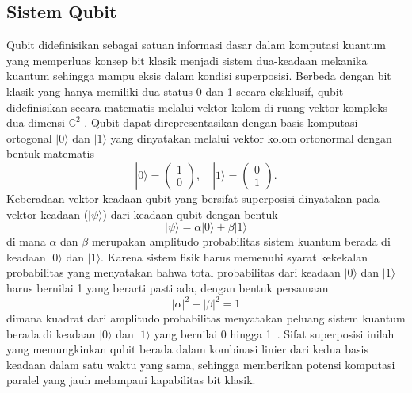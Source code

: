 \subsection{Sistem Qubit}
Qubit didefinisikan sebagai satuan informasi dasar dalam komputasi kuantum yang memperluas konsep bit klasik menjadi sistem dua-keadaan mekanika kuantum sehingga mampu eksis dalam kondisi superposisi. Berbeda dengan bit klasik yang hanya memiliki dua status 0 dan 1 secara eksklusif, qubit didefinisikan secara matematis melalui vektor kolom di ruang vektor kompleks dua-dimensi $\mathbb{C}^2$ \cite{nielsen_quantum_2010}. Qubit dapat direpresentasikan dengan basis komputasi ortogonal $|0\rangle$ dan $|1\rangle$ yang dinyatakan melalui vektor kolom ortonormal dengan bentuk matematis
\begin{equation}
\label{eq:basis_keadaan}
|0\rangle = \begin{pmatrix} 1 \\ 0 \end{pmatrix}, \quad |1\rangle = \begin{pmatrix} 0 \\ 1 \end{pmatrix}.
\end{equation}
Keberadaan vektor keadaan qubit yang bersifat superposisi dinyatakan pada vektor keadaan ($|\psi\rangle$) dari keadaan qubit dengan bentuk 
\begin{equation}
    |\psi\rangle = \alpha |0\rangle + \beta |1\rangle
\end{equation}
di mana $\alpha$ dan $\beta$ merupakan amplitudo probabilitas sistem kuantum berada di keadaan $|0\rangle$ dan $|1\rangle$. Karena sistem fisik harus memenuhi syarat kekekalan probabilitas yang menyatakan bahwa total probabilitas dari keadaan $|0\rangle$ dan $|1\rangle$ harus bernilai 1 yang berarti pasti ada, dengan bentuk persamaan 
\begin{equation}
    |\alpha|^2 + |\beta|^2 = 1
\end{equation}
dimana kuadrat dari amplitudo probabilitas menyatakan peluang sistem kuantum berada di keadaan $|0\rangle$ dan $|1\rangle$ yang bernilai 0 hingga 1~\cite{purwanto_fisika_2016}. Sifat superposisi inilah yang memungkinkan qubit berada dalam kombinasi linier dari kedua basis keadaan dalam satu waktu yang sama, sehingga memberikan potensi komputasi paralel yang jauh melampaui kapabilitas bit klasik.

